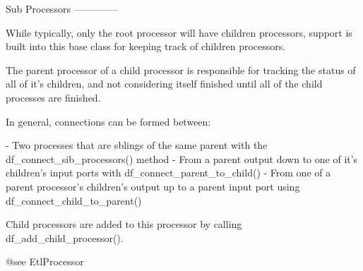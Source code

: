 \begin{DoxyVerb}
Sub Processors
--------------

While typically, only the root processor will have children processors,
support is built into this base class for keeping track of children
processors.

The parent processor of a child processor is responsible for tracking
the status of all of it's children, and not considering itself finished
until all of the child processes are finished.

In general, connections can be formed between:

  - Two processes that are sblings of the same parent with the
    df_connect_sib_processors() method
  - From a parent output down to one of it's children's input
    ports with df_connect_parent_to_child()
  - From one of a parent processor's children's output up to a parent
    input port using df_connect_child_to_parent()

Child processors are added to this processor by calling
df_add_child_processor().  

@see EtlProcessor
\end{DoxyVerb}
 


